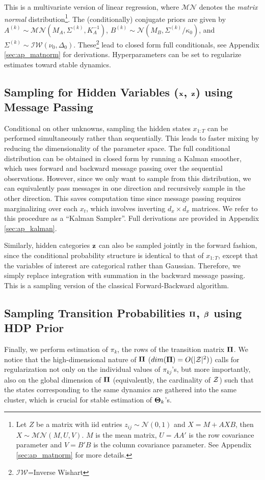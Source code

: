 \documentclass{article} %
\begin{document}
This is a multivariate version of linear regression, where $\mathcal{MN}$ denotes the \textit{matrix normal} distribution\footnote{Let $Z$ be a matrix with iid entries $z_{ij}\sim\mathcal{N}(0,1)$ and $X=M+AXB$, then $X\sim\mathcal{MN}(M,U,V)$. $M$ is the mean matrix, $U=AA'$ is the row covariance parameter and $V=B'B$ is the column covariance parameter. See Appendix \ref{sec:ap_matnorm} for more details.}. The (conditionally) conjugate priors are given by $A^{(k)}\sim\mathcal{MN}(M_A,\Sigma^{(k)},K_A^{-1})$, $B^{(k)}\sim\mathcal{N}(M_B,\Sigma^{(k)}/\kappa_0)$, and $\Sigma^{(k)}\sim\mathcal{IW}(\nu_0,\Delta_0)$. These\footnote{$\mathcal{IW}$=Inverse Wishart} lead to closed form full conditionals, see Appendix \ref{sec:ap_matnorm} for derivations. Hyperparameters can be set to regularize estimates toward stable dynamics.

\subsection{Sampling for Hidden Variables (${\bf x}$, ${\bf z}$) using Message Passing}

Conditional on other unknowns, sampling the hidden states $x_{1:T}$ can be performed simultaneously rather than sequentially. This leads to faster mixing by reducing the dimensionality of the parameter space. The full conditional distribution can be obtained in closed form by running a Kalman smoother, which uses forward and backward message passing over the sequential observations. However, since we only want to sample from this distribution, we can equivalently pass messages in one direction and recursively sample in the other direction. This saves computation time since message passing requires marginalizing over each $x_t$, which involves inverting $d_x\times d_x$ matrices. We refer to this procedure as a ``Kalman Sampler''. Full derivations are provided in Appendix \ref{sec:ap_kalman}.

Similarly, hidden categories ${\bf z}$ can also be sampled jointly in the forward fashion, since the conditional probability structure is identical to that of $x_{1:T}$, except that the variables of interest are categorical rather than Gaussian. Therefore, we simply replace integration with summation in the backward message passing. This is a sampling version of the classical Forward-Backward algorithm.

\subsection{Sampling Transition Probabilities $\boldsymbol{\Pi}$, $\boldsymbol{\beta}$ using HDP Prior}
Finally, we perform estimation of $\pi_k$, the rows of the transition matrix $\boldsymbol{\Pi}$. We notice that the high-dimensional nature of $\boldsymbol{\Pi}$ ($dim(\boldsymbol{\Pi}) = O(|{\cal Z}|^2)$) calls for regularization  not only on the individual values of $\pi_{kj}$'s, but more importantly, also on the global dimension of $\boldsymbol{\Pi}$ (equivalently, the cardinality of ${\cal Z}$) such that the states corresponding to the same dynamics are gathered into the same cluster, which is crucial for stable estimation of $\boldsymbol{\Theta}_k$'s.
\end{document}
